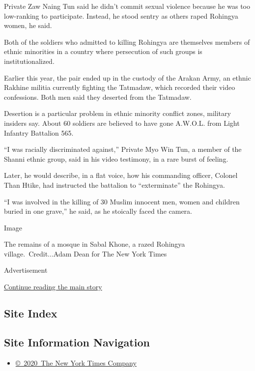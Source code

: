 Private Zaw Naing Tun said he didn't commit sexual violence because he
was too low-ranking to participate. Instead, he stood sentry as others
raped Rohingya women, he said.

Both of the soldiers who admitted to killing Rohingya are themselves
members of ethnic minorities in a country where persecution of such
groups is institutionalized.

Earlier this year, the pair ended up in the custody of the Arakan Army,
an ethnic Rakhine militia currently fighting the Tatmadaw, which
recorded their video confessions. Both men said they deserted from the
Tatmadaw.

Desertion is a particular problem in ethnic minority conflict zones,
military insiders say. About 60 soldiers are believed to have gone
A.W.O.L. from Light Infantry Battalion 565.

``I was racially discriminated against,'' Private Myo Win Tun, a member
of the Shanni ethnic group, said in his video testimony, in a rare burst
of feeling.

Later, he would describe, in a flat voice, how his commanding officer,
Colonel Than Htike, had instructed the battalion to ``exterminate'' the
Rohingya.

``I was involved in the killing of 30 Muslim innocent men, women and
children buried in one grave,'' he said, as he stoically faced the
camera.

Image

The remains of a mosque in Sabal Khone, a razed Rohingya
village.~Credit...Adam Dean for The New York Times

Advertisement

\protect\hyperlink{after-bottom}{Continue reading the main story}

\hypertarget{site-index}{%
\subsection{Site Index}\label{site-index}}

\hypertarget{site-information-navigation}{%
\subsection{Site Information
Navigation}\label{site-information-navigation}}

\begin{itemize}
\tightlist
\item
  \href{https://help.nytimes3xbfgragh.onion/hc/en-us/articles/115014792127-Copyright-notice}{©~2020~The
  New York Times Company}
\end{itemize}

